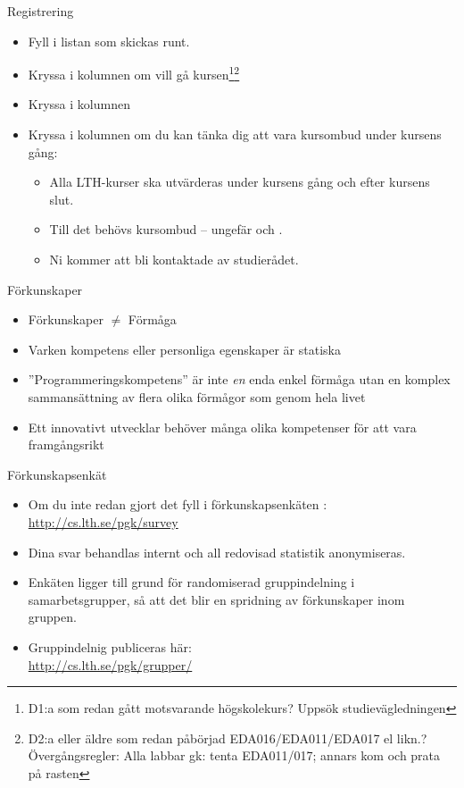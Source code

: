 \begin{Slide}{Registrering}
\begin{itemize}
\item Fyll i listan  som skickas runt.

\item Kryssa i kolumnen  om vill gå kursen\footnote{\scriptsize D1:a som redan gått motsvarande högskolekurs? Uppsök studievägledningen}\footnote{\scriptsize D2:a eller äldre som redan påbörjad EDA016/EDA011/EDA017 el likn.? Övergångsregler: Alla labbar gk: tenta EDA011/017; annars kom och prata på rasten}

\item Kryssa i kolumnen 

\item Kryssa i kolumnen  om du kan tänka dig att vara kursombud under kursens gång:
\begin{itemize}
\item Alla LTH-kurser ska utvärderas under kursens gång och efter kursens slut.
\item Till det behövs kursombud -- ungefär  och .
\item Ni kommer att bli kontaktade av studierådet.
\end{itemize}
\end{itemize}
\end{Slide}

\fi


\begin{Slide}{Förkunskaper}
\begin{itemize}
\item Förkunskaper $\neq$ Förmåga
\item Varken kompetens eller personliga egenskaper är statiska
\item ''Programmeringskompetens'' är inte \textit{en} enda enkel förmåga utan en komplex sammansättning av flera olika förmågor som  genom hela livet
\item Ett innovativt utvecklar behöver många olika kompetenser för att vara framgångsrikt
\end{itemize}
\end{Slide}

\ifkompendium\else

\begin{Slide}{Förkunskapsenkät}
\begin{itemize}
\item Om du inte redan gjort det fyll i förkunskapsenkäten :
\url{http://cs.lth.se/pgk/survey}
\item Dina svar behandlas internt och all redovisad statistik anonymiseras.
\item Enkäten ligger till grund för randomiserad gruppindelning i samarbetsgrupper, så att det blir en spridning av förkunskaper inom gruppen.
\item Gruppindelnig publiceras här: \\ \url{http://cs.lth.se/pgk/grupper/}
\end{itemize}
\end{Slide}

